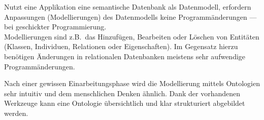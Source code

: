 Nutzt eine Applikation eine semantische Datenbank als Datenmodell, erfordern Anpassungen (Modellierungen) des Datenmodells keine Programmänderungen --- bei geschickter Programmierung.\\
Modellierungen sind z.B.\ das Hinzufügen, Bearbeiten oder Löschen von Entitäten (Klassen, Individuen, Relationen oder Eigenschaften).
Im Gegensatz hierzu benötigen Änderungen in relationalen Datenbanken meistens sehr aufwendige Programmänderungen.

Nach einer gewissen Einarbeitungsphase wird die Modellierung mittels Ontologien sehr intuitiv und dem menschlichen Denken ähnlich. Dank der vorhandenen Werkzeuge kann eine Ontologie übersichtlich und klar strukturiert abgebildet werden.
